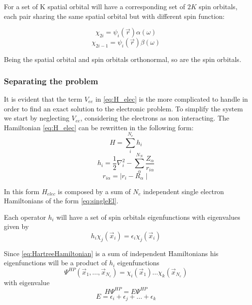 \documentclass[a4paper,12pt]{article}
\begin{document}
For a set of K spatial orbital will have a corresponding set of $2K$ spin orbitals, each pair sharing the same spatial orbital but with different spin function:

\begin{equation}
	\chi_{2i} = \psi_i(\vec{r}) \alpha(\omega)
\end{equation}
\begin{equation}
	\chi_{2i-1} = \psi_i(\vec{r}) \beta(\omega)
\end{equation}

Being the spatial orbital and spin orbitals orthonormal, so are the spin orbitals.

\subsubsection{Separating the problem}

It is evident that the term $V_{ee}$ in \eqref{eq:H_elec} is the more complicated to handle in order to find an exact solution to the electronic problem.
To simplify the system we start by neglecting $V_{ee}$, considering the electrons as non interacting.
The Hamiltonian \eqref{eq:H_elec} can be rewritten in the following form:
\begin{equation}\label{eq:HartreeHamiltonian}
	H  = \sum_{i}^{N_e} h_i
\end{equation}
\begin{equation}\label{eq:singleEl}
	h_i = \frac{1}{2} \nabla_{i}^2 - \sum_{\alpha}^{N_N} \frac{Z_{\alpha}}{r_{i\alpha}}
\end{equation}
\begin{equation}
	r_{i\alpha} = \mid r_i - R_{\alpha} \mid
\end{equation}

In this form $H_{elec}$ is composed by a sum of $N_e$ independent single electron Hamiltonians of the form \eqref{eq:singleEl}.

Each operator $h_i$ will have a set of spin orbitals eigenfunctions with eigenvalues given by
\begin{equation}
	h_i \chi_{j}(\vec{x}_i) = \epsilon_{i} \chi_{j}(\vec{x}_i)
\end{equation}

Since \eqref{eq:HartreeHamiltonian} is a sum of independent Hamiltonians his eigenfunctions will be a product of $h_i$ eigenfunctions
\begin{equation}\label{eq:HartreeProduct}
	\Psi^{HP}(\vec{x}_1,...,\vec{x}_{N_e}) = \chi_i(\vec{x}_1)...\chi_k(\vec{x}_{N_e})
\end{equation}
with eigenvalue
\begin{equation}
	H\Psi^{HP} = E\Psi^{HP}
\end{equation}
\begin{equation}
	E = \epsilon_i + \epsilon_j + ... + \epsilon_k
\end{equation}
\end{document}
